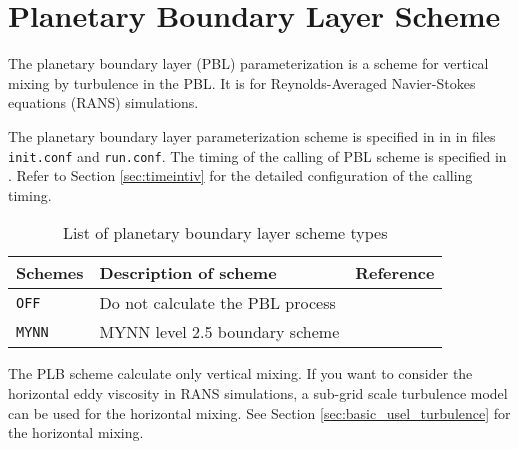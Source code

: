 
\section{Planetary Boundary Layer Scheme} \label{sec:basic_usel_pbl}

The planetary boundary layer (PBL) parameterization is a scheme for vertical mixing by turbulence in the PBL.
It is for Reynolds-Averaged Navier-Stokes equations (RANS) simulations.

The planetary boundary layer parameterization scheme is specified in  in  in files \verb|init.conf| and \verb|run.conf|. The timing of the calling of PBL scheme is specified in . Refer to Section \ref{sec:timeintiv} for the detailed configuration of the calling timing.

\begin{table}[h]
\begin{center}
  \caption{List of planetary boundary layer scheme types}
  \label{tab:nml_atm_bl}
  \begin{tabularx}{150mm}{lXX} \hline
    \rowcolor[gray]{0.9}  Schemes & Description of scheme & Reference\\ \hline
      \verb|OFF|          & Do not calculate the PBL process &  \\
      \verb|MYNN|         & MYNN level 2.5 boundary scheme & \citet{my_1982,nakanishi_2004,nakanishi_2009} \\
    \hline
  \end{tabularx}
\end{center}
\end{table}

The PLB scheme calculate only vertical mixing.
If you want to consider the horizontal eddy viscosity in RANS simulations,
a sub-grid scale turbulence model can be used for the horizontal mixing.
See Section \ref{sec:basic_usel_turbulence} for the horizontal mixing.
